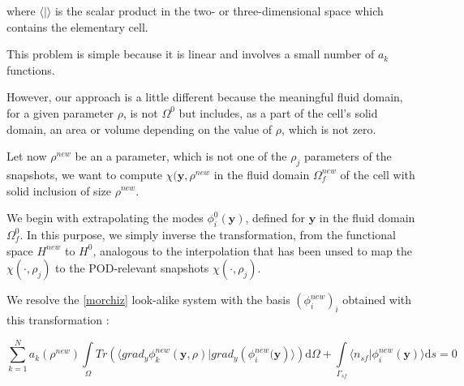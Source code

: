 where $\langle |\rangle$ is the scalar product in the two- or three-dimensional space which contains the elementary cell.

\par
This problem is simple because it is linear and involves a small number of $a_k$ functions.%


\etoile
However, our approach is a little different because the meaningful fluid domain, for a given parameter $\rho$, %
is not $\Omega^0$ but includes, as a part of the cell's solid domain, an area or volume depending on the value of $\rho$, %
which is not zero.

\par
Let now $\rho^{new}$ be an a parameter, which is not one of the $\rho_j$ parameters of the snapshots, %
we want to compute $\chi(\mathbf{y},\rho^{new}$ in the fluid domain $\Omega_f^{new}$ of the cell with solid inclusion of size $\rho^{new}$.

\par
We begin with extrapolating the modes $\phi_i^0(\mathbf{y})$, defined for $\mathbf{y}$ in the fluid domain $\Omega_f^0$. %
In this purpose, we simply inverse the transformation, from the functional space $H^{new}$ to $H^0$, %
analogous to the interpolation that has been unsed to map the $\chi(\cdot,\rho_j)$ to the POD-relevant snapshots $\chi (\cdot ,\rho_j)$.

\par
We resolve the \ref{morchiz} look-alike system with the basis $(\phi_i^{new})_i$ obtained with this transformation :

\begin{equation}
\sum\limits_{k=1}^N a_k(\rho^{new})\int\limits_{\Omega}Tr\left(\langle grad_y\phi_k^{new} \left(\mathbf{y},\rho\right)|grad_y\left(\phi_i^{new}(\mathbf{y}\right)\rangle\right)\text{d}\Omega+%
\int\limits_{\Gamma_{sf}}\langle n_{sf}|\phi_i^{new}(\mathbf{y})\rangle \text{d}s %
=0
\label{morchi}
\end{equation}

